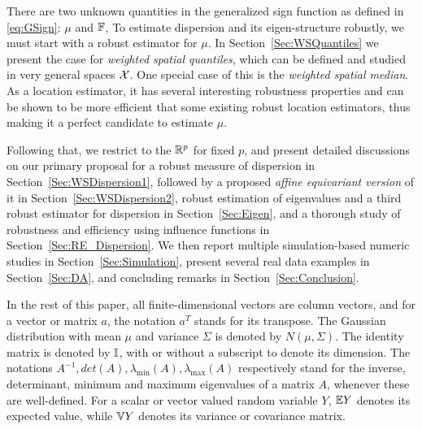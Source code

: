 There are two unknown quantities in the generalized sign function as defined in \eqref{eq:GSign}: $\mu$ and ${\mathbb{F}}$, To estimate dispersion and its eigen-structure robustly, we must start with a robust estimator for $\mu$. In Section~\ref{Sec:WSQuantiles} we present the case for \textit{weighted spatial quantiles}, which can be defined and studied in very general spaces 
$\mathcal{X}$. One special case of this is the {\it weighted spatial median}. As a location estimator, it has several interesting robustness properties and can be shown to be more efficient that some existing robust location estimators, thus making it a perfect candidate to estimate $\mu$. 

Following that, we restrict to the ${\mathbb{R}}^{p}$ for fixed $p$, and present detailed discussions on our primary proposal for a  robust measure of dispersion in Section~\ref{Sec:WSDispersion1}, followed by a proposed \textit{ affine equivariant version} of it in Section~\ref{Sec:WSDispersion2}, robust estimation of eigenvalues and a third robust estimator for dispersion in Section~\ref{Sec:Eigen}, and a thorough study of robustness and efficiency using influence functions in Section~\ref{Sec:RE_Dispersion}. We then report multiple simulation-based numeric studies in Section~\ref{Sec:Simulation}, present several real data examples in Section~\ref{Sec:DA}, and concluding remarks in Section~\ref{Sec:Conclusion}.

In the rest of this paper, all finite-dimensional vectors are column vectors, and for a vector or matrix $a$, the notation $a^{T}$ stands for its transpose. The Gaussian distribution with mean $\mu$ and variance $\Sigma$ is denoted by $N (\mu, \Sigma)$. The identity matrix  is denoted by ${\mathbb{I}}$, with or without a subscript to denote its dimension. The notations $A^{-1}, det (A), \lambda_{\min} (A), \lambda_{\max} (A)$ respectively stand for the inverse, determinant, minimum and maximum eigenvalues of a matrix $A$, whenever these are well-defined. For a scalar or vector valued random variable $Y$, ${\mathbb{E}} Y$ denotes its expected value, while ${\mathbb{V}} Y$ denotes its variance or covariance matrix.